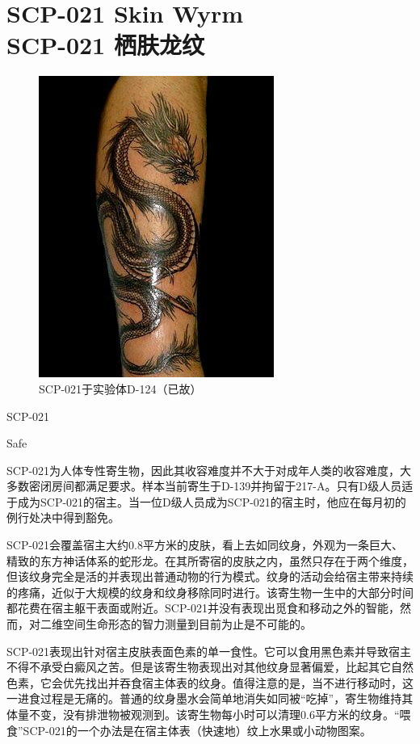 \chapter[SCP-021 栖肤龙纹]{
    SCP-021 Skin Wyrm\\
    SCP-021 栖肤龙纹
}

\label{chap:SCP-021}

\begin{figure}[H]
    \centering
    \includegraphics[width=0.5\linewidth]{images/SCP-021.jpg}
    \caption*{SCP-021于实验体D-124（已故）}
\end{figure}

 SCP-021

 Safe

 SCP-021为人体专性寄生物，因此其收容难度并不大于对成年人类的收容难度，大多数密闭房间都满足要求。样本当前寄生于D-139并拘留于217-A。只有D级人员适于成为SCP-021的宿主。当一位D级人员成为SCP-021的宿主时，他应在每月初的例行处决中得到豁免。

 SCP-021会覆盖宿主大约0.8平方米的皮肤，看上去如同纹身，外观为一条巨大、精致的东方神话体系的蛇形龙。在其所寄宿的皮肤之内，虽然只存在于两个维度，但该纹身完全是活的并表现出普通动物的行为模式。纹身的活动会给宿主带来持续的疼痛，近似于大规模的纹身和纹身移除同时进行。该寄生物一生中的大部分时间都花费在宿主躯干表面或附近。SCP-021并没有表现出觅食和移动之外的智能，然而，对二维空间生命形态的智力测量到目前为止是不可能的。

SCP-021表现出针对宿主皮肤表面色素的单一食性。它可以食用黑色素并导致宿主不得不承受白癜风之苦。但是该寄生物表现出对其他纹身显著偏爱，比起其它自然色素，它会优先找出并吞食宿主体表的纹身。值得注意的是，当不进行移动时，这一进食过程是无痛的。普通的纹身墨水会简单地消失如同被“吃掉”，寄生物维持其体量不变，没有排泄物被观测到。该寄生物每小时可以清理0.6平方米的纹身。“喂食”SCP-021的一个办法是在宿主体表（快速地）纹上水果或小动物图案。

